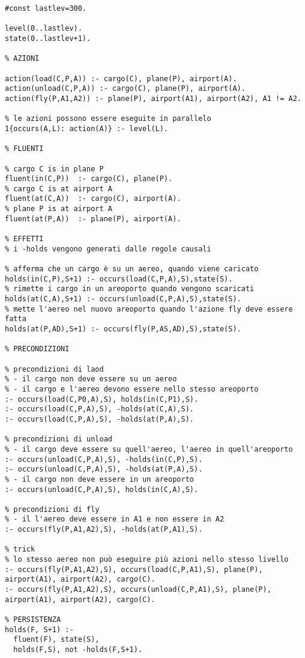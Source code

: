 \begin{lstlisting}
#const lastlev=300.

level(0..lastlev).
state(0..lastlev+1).

% AZIONI

action(load(C,P,A)) :- cargo(C), plane(P), airport(A).
action(unload(C,P,A)) :- cargo(C), plane(P), airport(A).
action(fly(P,A1,A2)) :- plane(P), airport(A1), airport(A2), A1 != A2.

% le azioni possono essere eseguite in parallelo
1{occurs(A,L): action(A)} :- level(L).

% FLUENTI

% cargo C is in plane P
fluent(in(C,P))  :- cargo(C), plane(P).
% cargo C is at airport A
fluent(at(C,A))  :- cargo(C), airport(A).
% plane P is at airport A
fluent(at(P,A))  :- plane(P), airport(A).

% EFFETTI
% i -holds vengono generati dalle regole causali

% afferma che un cargo è su un aereo, quando viene caricato
holds(in(C,P),S+1) :- occurs(load(C,P,A),S),state(S).
% rimette i cargo in un areoporto quando vengono scaricati
holds(at(C,A),S+1) :- occurs(unload(C,P,A),S),state(S).
% mette l'aereo nel nuovo areoporto quando l'azione fly deve essere fatta
holds(at(P,AD),S+1) :- occurs(fly(P,AS,AD),S),state(S).

% PRECONDIZIONI

% precondizioni di laod
% - il cargo non deve essere su un aereo
% - il cargo e l'aereo devono essere nello stesso areoporto
:- occurs(load(C,P0,A),S), holds(in(C,P1),S).
:- occurs(load(C,P,A),S), -holds(at(C,A),S).
:- occurs(load(C,P,A),S), -holds(at(P,A),S).

% precondizioni di unload
% - il cargo deve essere su quell'aereo, l'aereo in quell'areoporto
:- occurs(unload(C,P,A),S), -holds(in(C,P),S).
:- occurs(unload(C,P,A),S), -holds(at(P,A),S).
% - il cargo non deve essere in un areoporto
:- occurs(unload(C,P,A),S), holds(in(C,A),S).

% precondizioni di fly
% - il l'aereo deve essere in A1 e non essere in A2
:- occurs(fly(P,A1,A2),S), -holds(at(P,A1),S).

% trick
% lo stesso aereo non può eseguire più azioni nello stesso livello
:- occurs(fly(P,A1,A2),S), occurs(load(C,P,A1),S), plane(P), airport(A1), airport(A2), cargo(C).
:- occurs(fly(P,A1,A2),S), occurs(unload(C,P,A1),S), plane(P), airport(A1), airport(A2), cargo(C).

% PERSISTENZA
holds(F, S+1) :-
  fluent(F), state(S),
  holds(F,S), not -holds(F,S+1).


\end{lstlisting}
